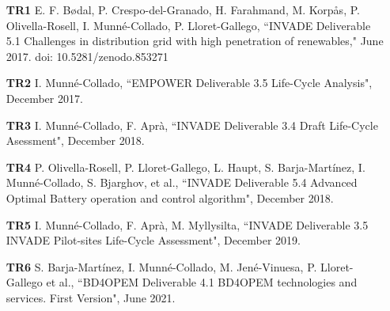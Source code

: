 \begin{itemize}
	\item[\textbf{TR1}] E. F. B\o{}dal, P. Crespo-del-Granado, H. Farahmand, M. Korp\aa{}s, P. Olivella-Rosell, I. Munn\'{e}-Collado, P. Lloret-Gallego, ``INVADE Deliverable 5.1 Challenges in distribution grid with high penetration of renewables," June 2017. doi: 10.5281/zenodo.853271
	\item[\textbf{TR2}] I. Munn\'{e}-Collado, ``EMPOWER Deliverable 3.5 Life-Cycle Analysis", December 2017.
	\item[\textbf{TR3}] I. Munn\'{e}-Collado, F. Apr\`{a}, ``INVADE Deliverable 3.4 Draft Life-Cycle Asessment", December 2018.
	\item[\textbf{TR4}] P. Olivella-Rosell, P. Lloret-Gallego, L. Haupt, S. Barja-Mart\'{i}nez, I. Munn\'{e}-Collado, S. Bjarghov, et al., ``INVADE Deliverable 5.4 Advanced Optimal Battery operation and control algorithm", December 2018.
	\item[\textbf{TR5}] I. Munn\'{e}-Collado, F. Apr\`{a}, M. Myllysilta, ``INVADE Deliverable 3.5 INVADE Pilot-sites Life-Cycle Assessment", December 2019.	
	\item[\textbf{TR6}] S. Barja-Mart\'{i}nez, I. Munn\'{e}-Collado, M. Jen\'{e}-Vinuesa, P. Lloret-Gallego et al., ``BD4OPEM Deliverable 4.1 BD4OPEM technologies and services. First Version", June 2021.	
\end{itemize}
